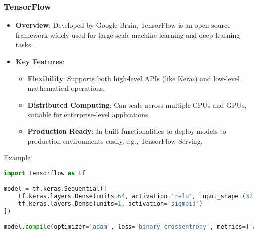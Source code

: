 \documentclass[aspectratio=169]{beamer}
\begin{document}
\begin{frame}[fragile]
  \frametitle{TensorFlow}
  \begin{itemize}
    \item \textbf{Overview}: Developed by Google Brain, TensorFlow is an open-source framework widely used for large-scale machine learning and deep learning tasks.
    \item \textbf{Key Features}:
      \begin{itemize}
        \item \textbf{Flexibility}: Supports both high-level APIs (like Keras) and low-level mathematical operations.
        \item \textbf{Distributed Computing}: Can scale across multiple CPUs and GPUs, suitable for enterprise-level applications.
        \item \textbf{Production Ready}: In-built functionalities to deploy models to production environments easily, e.g., TensorFlow Serving.
      \end{itemize}
  \end{itemize}

  \begin{block}{Example}
    \begin{lstlisting}[language=Python]
import tensorflow as tf

model = tf.keras.Sequential([
    tf.keras.layers.Dense(units=64, activation='relu', input_shape=(32,)),
    tf.keras.layers.Dense(units=1, activation='sigmoid')
])

model.compile(optimizer='adam', loss='binary_crossentropy', metrics=['accuracy'])
    \end{lstlisting}
  \end{block}
\end{frame}
\end{document}
